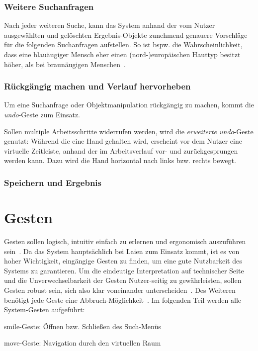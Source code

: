\documentclass{sigchi-ext}
\begin{document}
\subsubsection{Weitere Suchanfragen}
Nach jeder weiteren Suche, kann das System anhand der vom Nutzer
ausgewählten und gelöschten Ergebnis-Objekte zunehmend genauere
Vorschläge für die folgenden Suchanfragen aufstellen. 
So ist bspw. die Wahrscheinlichkeit, dass eine blauäugiger Mensch eher einen
(nord-)europäischen Hauttyp besitzt höher, als bei braunäugigen
Menschen~\cite{eyecolor:article}.

\subsubsection{Rückgängig machen und Verlauf hervorheben}
Um eine Suchanfrage oder Objektmanipulation rückgängig zu machen,
kommt die \textit{undo}-Geste zum Einsatz. 

Sollen multiple Arbeitsschritte
widerrufen werden, wird die \textit{erweiterte undo}-Geste genutzt: 
Während die eine Hand gehalten wird, erscheint vor dem Nutzer eine virtuelle
Zeitleiste, anhand der im Arbeitsverlauf vor- und zurückgesprungen
werden kann. Dazu wird die Hand horizontal nach links bzw. rechts
bewegt. 

\subsubsection{Speichern und Ergebnis}


\section{Gesten}
Gesten sollen logisch, intuitiv einfach zu erlernen und ergonomisch auszuführen sein~\cite{3dinteraction:book}. 
Da das System hauptsächlich bei Laien zum Einsatz kommt, ist es von hoher Wichtigkeit, eingängige Gesten zu finden, um eine gute Nutzbarkeit des Systems zu garantieren.
Um die eindeutige Interpretation auf technischer Seite und die Unverwechselbarkeit der Gesten Nutzer-seitig zu gewährleisten, sollen Gesten robust sein, sich also klar voneinander unterscheiden~\cite{3dinteraction:book,Dorau11}.
Des Weiteren benötigt jede Geste eine Abbruch-Möglichkeit~\cite{Dorau11}. Im folgenden Teil werden alle System-Gesten aufgeführt:

smile-Geste: Öffnen bzw. Schließen des Such-Menüs

move-Geste: Navigation durch den virtuellen Raum
\end{document}
